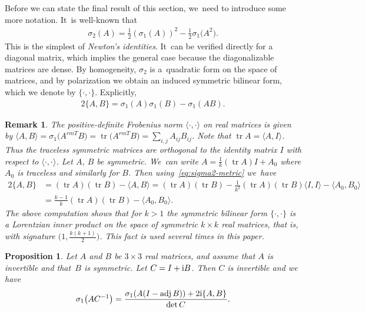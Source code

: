 \documentclass[pdftex]{sigma}
\def\adj{\operatorname{adj}}
\def\tr{\operatorname{tr}}
\newtheorem{Proposition}[Theorem]{Proposition}
\newtheorem{Remark}[Theorem]{Remark}}
\numberwithin{equation}{section}
\begin{document}
Before we can state the final result of this section, we~need to introduce some more notation. It~is well-known that
\begin{gather*} %
\sigma_2 (A) = \frac{1}{2} ( \sigma_1 (A) )^2 - \frac{1}{2} \sigma_1 \big(A^2\big).
\end{gather*}
This is the simplest of \emph{Newton's identities}. It~can be verified directly for a diagonal matrix, which implies the general case because the diagonalizable matrices are dense. By homogeneity, $\sigma_2$ is a~quadratic form on the space of matrices, and by polarization we obtain an induced symmetric bilinear form, which we denote by $\{ \cdot, \cdot \}$. Explicitly,
\begin{gather} \label{eq:sigma2-metric}
2 \{ A, B \} = \sigma_1 (A) \sigma_1 (B) - \sigma_1 (AB).
\end{gather}

\begin{Remark} \label{rmk:sigma2-metric}
The positive-definite Frobenius norm $\langle \cdot, \cdot \rangle$ on real matrices is given by $\langle A, B \rangle = \sigma_1 \big(A^{rm T} B\big) = \tr \big(A^{rm T} B\big) = \sum_{i,j} A_{ij} B_{ij}$. Note that $\tr A = \langle A, I \rangle$. Thus the traceless symmetric matrices are orthogonal to the identity matrix $I$ with respect to $\langle \cdot, \cdot \rangle$. Let $A$, $B$ be symmetric. We~can write $A = \frac{1}{k} (\tr A) I + A_0$ where $A_0$ is traceless and similarly for $B$. Then using~\eqref{eq:sigma2-metric} we~have
\begin{align*}
2 \{ A, B \} & = (\tr A) (\tr B) - \langle A, B \rangle = (\tr A) (\tr B) - \frac{1}{k^2} (\tr A) (\tr B) \langle I, I \rangle - \langle A_0, B_0 \rangle \\
& = \frac{k-1}{k} (\tr A) (\tr B) - \langle A_0, B_0 \rangle.
\end{align*}
The above computation shows that for $k > 1$ the symmetric bilinear form $\{ \cdot, \cdot \}$ is a \emph{Lorentzian} inner product on the space of symmetric $k \times k$ real matrices, that is, with signature $\big(1, \frac{k(k+1)}{2}\big)$. This fact is used several times in this paper.
\end{Remark}

\begin{Proposition} \label{prop:sigma-adj-2}
Let $A$ and $B$ be $3 \times 3$ \emph{real} matrices, and assume that $A$ is invertible and that~$B$ is symmetric. Let $C = I + {\rm i} B$. Then $C$ is invertible and we have
\begin{gather*} %
\sigma_1 \big(AC^{-1}\big) = \frac{\sigma_1(A(I - \adj B)) + 2{\rm i} \{ A, B \} }{\det C}.
\end{gather*}
\end{Proposition}
\end{document}
